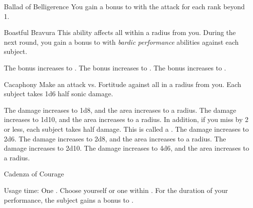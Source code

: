 {\begin{durationability}{Ballad of Belligerence}
                \rankline
                You gain a  bonus to  with the attack for each rank beyond 1.
            \end{durationability}

            \begin{durationability}{Boastful Bravura}
                \rankline
                This ability affects all  within a \arealarge radius from you.
                During the next round, you gain a  bonus to  with \textit{bardic performance} abilities against each subject.

                \rankline
                 The bonus increases to .
                 The bonus increases to .
                 The bonus increases to .
            \end{durationability}

            \begin{instantability}{Cacaphony}
                \rankline
                Make an attack vs. Fortitude against all  in a \tinyarea radius from you.
                \hit Each subject takes 1d6 \add half  sonic damage.

                \rankline
                 The damage increases to 1d8, and the area increases to a \smallarea radius.
                 The damage increases to 1d10, and the area increases to a \medarea radius.
                    In addition, if you miss by 2 or less, each subject takes half damage.
                    This is called a .
                 The damage increases to 2d6.
                 The damage increases to 2d8, and the area increases to a \largearea radius.
                 The damage increases to 2d10.
                 The damage increases to 4d6, and the area increases to a \hugearea radius.
            \end{instantability}

            \begin{durationability}{Cadenza of Courage}
                \par \noindent Usage time: One .
                \rankline
                Choose yourself or one  within \medrange.
                For the duration of your performance, the subject gains a  bonus to .


\end{durationability}}
